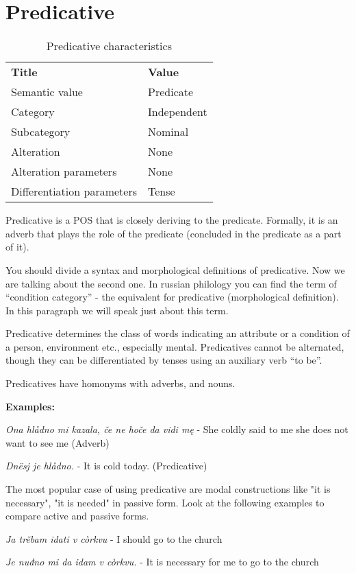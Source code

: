 \section{Predicative}

\begin{table}[!htb]
	\caption{Predicative characteristics}
	\begin{tabular}{ll}
		\textbf{Title}              & \textbf{Value}                            \\
		Semantic value              & Predicate                                 \\
		Category                    & Independent                               \\
		Subcategory                 & Nominal                                   \\
		Alteration                  & None                                      \\
		Alteration parameters       & None                                      \\
		Differentiation parameters  & Tense                                  
	\end{tabular}
\end{table}

Predicative is a POS that is closely deriving to the predicate. Formally, it is an adverb that plays the role of the predicate (concluded in the predicate as a part of it). 

You should divide a syntax and morphological definitions of predicative. Now we are talking about the second one. In russian philology you can find the term of “condition category” - the equivalent for predicative (morphological definition). In this paragraph we will speak just about this term.

Predicative determines the class of words indicating an attribute or a condition of a person, environment etc., especially mental. Predicatives cannot be alternated, though they can be differentiated by tenses using an auxiliary verb “to be”. 

Predicatives have homonyms with adverbs, and nouns.  

\textbf{Examples:}

\textit{Ona hlådno mi kazala, če ne hoče da vidi mę} - She coldly said to me she does not want to see me (Adverb)

\textit{Dnësj je hlådno.} - It is cold today. (Predicative)

The most popular case of using predicative are modal constructions like "it is necessary", "it is needed" in passive form. Look at the following examples to compare active and passive forms.

\textit{Ja trěbam idati v còrkvu} - I should go to the church

\textit{Je nuđno mi da idam v còrkvu.} -  It is necessary for me to go to the church